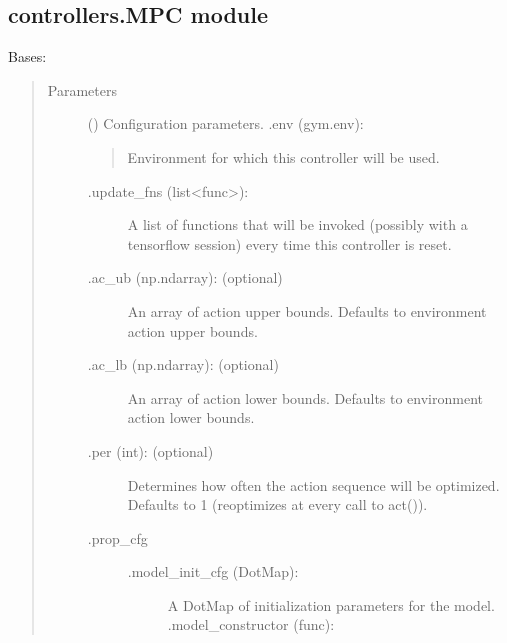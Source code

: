 \documentclass[letterpaper,10pt,english,openany,oneside]{sphinxmanual}
\begin{document}
\subsection{controllers.MPC module}
\label{\detokenize{_modules/controllers:module-controllers.MPC}}\label{\detokenize{_modules/controllers:controllers-mpc-module}}

\begin{fulllineitems}
\label{\detokenize{_modules/controllers:controllers.MPC.MPC}}
Bases: {\hyperref[\detokenize{_modules/controllers:controllers.Controller.Controller}]{}}
\begin{quote}\begin{description}
\item[{Parameters}] \leavevmode
{} () \textendash{} 
Configuration parameters.
.env (gym.env):
\begin{quote}

Environment for which this controller will be used.
\end{quote}
\begin{description}
\item[{.update\_fns (list\textless{}func\textgreater{}):}] \leavevmode
A list of functions that will be invoked (possibly with a
tensorflow session) every time this controller is reset.

\item[{.ac\_ub (np.ndarray): (optional)}] \leavevmode
An array of action upper bounds. Defaults to environment action
upper bounds.

\item[{.ac\_lb (np.ndarray): (optional)}] \leavevmode
An array of action lower bounds. Defaults to environment action
lower bounds.

\item[{.per (int): (optional)}] \leavevmode
Determines how often the action sequence will be optimized.
Defaults to 1 (reoptimizes at every call to act()).

\item[{.prop\_cfg}] \leavevmode\begin{description}
\item[{.model\_init\_cfg (DotMap):}] \leavevmode
A DotMap of initialization parameters for the model.
.model\_constructor (func):
\begin{quote}


\end{quote}
\end{description}
\end{description}
\end{description}
\end{quote}
\end{fulllineitems}
\end{document}

